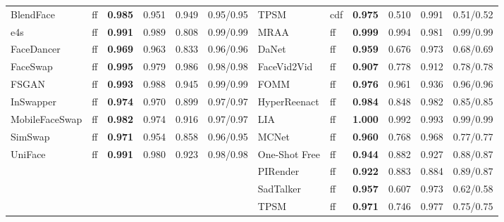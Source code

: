 \begin{table}[t]
\begin{tabular}{llcccc@{\hskip 10pt}llcccc}
BlendFace & ff & \textbf{0.985} & 0.951 & 0.949 & 0.95/0.95 & TPSM & cdf & \textbf{0.975} & 0.510 & 0.991 & 0.51/0.52 \\
e4s & ff & \textbf{0.991} & 0.989 & 0.808 & 0.99/0.99 & MRAA & ff & \textbf{0.999} & 0.994 & 0.981 & 0.99/0.99 \\
FaceDancer & ff & \textbf{0.969} & 0.963 & 0.833 & 0.96/0.96 & DaNet & ff & \textbf{0.959} & 0.676 & 0.973 & 0.68/0.69 \\
FaceSwap & ff & \textbf{0.995} & 0.979 & 0.986 & 0.98/0.98 & FaceVid2Vid & ff & \textbf{0.907} & 0.778 & 0.912 & 0.78/0.78 \\
FSGAN & ff & \textbf{0.993} & 0.988 & 0.945 & 0.99/0.99 & FOMM & ff & \textbf{0.976} & 0.961 & 0.936 & 0.96/0.96 \\
InSwapper & ff & \textbf{0.974} & 0.970 & 0.899 & 0.97/0.97 & HyperReenact & ff & \textbf{0.984} & 0.848 & 0.982 & 0.85/0.85 \\
MobileFaceSwap & ff & \textbf{0.982} & 0.974 & 0.916 & 0.97/0.97 & LIA & ff & \textbf{1.000} & 0.992 & 0.993 & 0.99/0.99 \\
SimSwap & ff & \textbf{0.971} & 0.954 & 0.858 & 0.96/0.95 & MCNet & ff & \textbf{0.960} & 0.768 & 0.968 & 0.77/0.77 \\
UniFace & ff & \textbf{0.991} & 0.980 & 0.923 & 0.98/0.98 & One-Shot Free & ff & \textbf{0.944} & 0.882 & 0.927 & 0.88/0.87 \\
 &  &  &  &  &   & PIRender & ff & \textbf{0.922} & 0.883 & 0.884 & 0.89/0.87 \\
 &  &  &  &  &   & SadTalker & ff & \textbf{0.957} & 0.607 & 0.973 & 0.62/0.58 \\
 &  &  &  &  &   & TPSM & ff & \textbf{0.971} & 0.746 & 0.977 & 0.75/0.75 \\
\bottomrule
\end{tabular}
\end{table}
